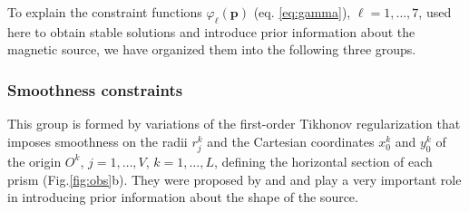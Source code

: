 To explain the constraint functions $\varphi_{\ell}(\mathbf{p})$ (eq. \ref{eq:gamma}), $\ell = 1, \dots, 7$, used here to obtain stable solutions and introduce prior information about the magnetic source, we have organized  them into the following three groups.

\subsubsection{Smoothness constraints}

This group is formed by variations of the first-order Tikhonov regularization \cite[][ p. 103]{aster-etal2019} that imposes smoothness on the radii $r_{j}^{k}$ and the Cartesian coordinates $x_{0}^{k}$ and $y_{0}^{k}$ of the origin $O^{k}$, $j = 1, \dots, V$, $k = 1, \dots, L$, defining the horizontal section of each prism (Fig.\ref{fig:obs}b).
They were proposed by \cite{oliveirajr-etal2011} and \cite{oliveirajr-barbosa2013} and play a very important role in introducing prior information about the shape of the source. 

